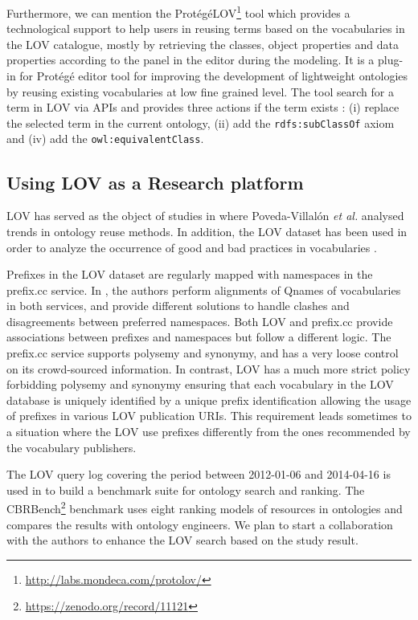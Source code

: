 \documentclass{iosart2c}
\begin{document}
Furthermore, we can mention the Prot{\'e}g{\'e}LOV\footnote{\url{http://labs.mondeca.com/protolov/}} tool which provides a technological support to help users in reusing terms based on the vocabularies in the LOV catalogue, mostly by retrieving the classes, object properties and data properties according to the panel in the editor during the modeling. It is a plug-in for Prot{\'e}g{\'e} editor tool \cite{prolov2015} for improving the development of lightweight ontologies by reusing existing vocabularies at low fine grained level. The tool search for a term in LOV via APIs and provides three actions if the term exists : (i) replace the selected term in the current ontology, (ii) add the \texttt{rdfs:subClassOf} axiom and (iv) add the \texttt{owl:equivalentClass}.


\subsection{Using LOV as a Research platform}

LOV has served as the object of studies in \cite{poveda2012landscape} where Poveda-Villal\'on \emph{et al.} analysed trends in ontology reuse methods. In addition, the LOV dataset has been used in order to analyze the occurrence of good and bad practices in vocabularies \cite{poveda2013detecting}.

Prefixes in the LOV dataset are regularly mapped with namespaces in the prefix.cc service. In \cite{wasabi13}, the authors perform alignments of Qnames of vocabularies in both services, and provide different solutions to handle clashes and disagreements between preferred namespaces. Both  LOV and prefix.cc provide associations between prefixes and namespaces but follow a different logic. The prefix.cc service supports polysemy and synonymy, and has a very loose control on its crowd-sourced information. In contrast, LOV has a much more strict policy forbidding polysemy and synonymy ensuring that each vocabulary in the LOV database is uniquely identified by a unique prefix identification allowing the usage of prefixes in various LOV publication URIs. This requirement leads sometimes to a situation where the LOV use prefixes differently from the ones recommended by the vocabulary publishers.

The LOV query log covering the period between 2012-01-06 and 2014-04-16 is used in \cite{butt2014} to build a benchmark suite for ontology search and ranking. The CBRBench\footnote{\url{https://zenodo.org/record/11121}} benchmark uses eight ranking models of resources in ontologies and compares the results with ontology engineers. We plan to start a collaboration with the authors to enhance the LOV search based on the study result.
\end{document}
